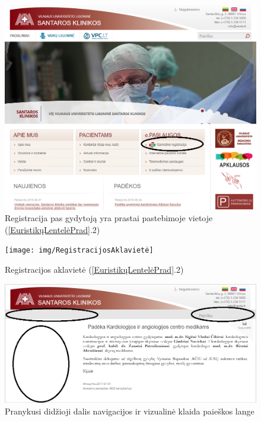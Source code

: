 \documentclass{VUMIFPSkursinis}
\begin{document}

\begin{figure}[H]
    \centering
    \includegraphics[scale=0.6]{img/RegistracijaPagrindinis}
    \caption{Registracija pas gydytoją yra prastai pastebimoje vietoje (\ref{EuristikųLentelėPrad}.2)}
    \label{img:RegistracijaPagrindinis}
\end{figure}

\begin{figure}[H]
    \centering
    \texttt{[image: img/RegistracijosAklavietė]}
    \caption{Registracijos aklavietė (\ref{EuristikųLentelėPrad}.2)}
    \label{img:registracija}
\end{figure}

\begin{figure}[H]
    \centering
    \includegraphics[scale=0.55]{img/AtvaizdavimoKlaida}
    \caption{Pranykusi didžioji dalis navigacijos ir vizualinė klaida paieškos lange}
    \label{img:atvaizdavimoklaida}
\end{figure}
\end{document}
